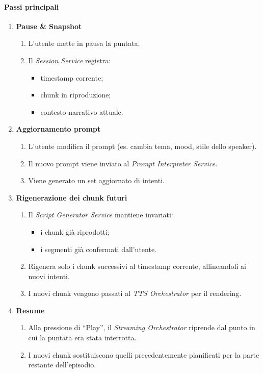 \documentclass[11pt,a4paper]{article}
\begin{document}
\paragraph{Passi principali}

\begin{enumerate}
    \item \textbf{Pause \& Snapshot}
    \begin{enumerate}
        \item L'utente mette in pausa la puntata.
        \item Il \textit{Session Service} registra:
        \begin{itemize}
            \item timestamp corrente;
            \item chunk in riproduzione;
            \item contesto narrativo attuale.
        \end{itemize}
    \end{enumerate}

    \item \textbf{Aggiornamento prompt}
    \begin{enumerate}
        \item L'utente modifica il prompt (es. cambia tema, mood, stile dello speaker).
        \item Il nuovo prompt viene inviato al \textit{Prompt Interpreter Service}.
        \item Viene generato un set aggiornato di intenti.
    \end{enumerate}

    \item \textbf{Rigenerazione dei chunk futuri}
    \begin{enumerate}
        \item Il \textit{Script Generator Service} mantiene invariati:
        \begin{itemize}
            \item i chunk già riprodotti;
            \item i segmenti già confermati dall'utente.
        \end{itemize}
        \item Rigenera solo i chunk successivi al timestamp corrente, allineandoli ai nuovi intenti.
        \item I nuovi chunk vengono passati al \textit{TTS Orchestrator} per il rendering.
    \end{enumerate}

    \item \textbf{Resume}
    \begin{enumerate}
        \item Alla pressione di ``Play'', il \textit{Streaming Orchestrator} riprende dal punto in cui la puntata era stata interrotta.
        \item I nuovi chunk sostituiscono quelli precedentemente pianificati per la parte restante dell'episodio.
    \end{enumerate}
\end{enumerate}
\end{document}
